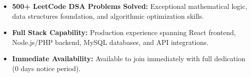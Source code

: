 \documentclass[a4paper,10pt]{article}
\begin{document}
\begin{itemize}

    \item \textbf{500+ LeetCode DSA Problems Solved:} Exceptional mathematical logic, data structures foundation, and algorithmic optimization skills.

    \item \textbf{Full Stack Capability:} Production experience spanning React frontend, Node.js/PHP backend, MySQL databases, and API integrations.

    \item \textbf{Immediate Availability:} Available to join immediately with full dedication (0 days notice period).

\end{itemize}

\end{document}
